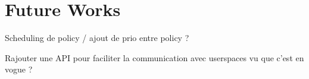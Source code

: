 \section{Future Works}
\par Scheduling de policy / ajout de prio entre policy ?
\par Rajouter une API pour faciliter la communication avec userspaces vu que c'est en vogue ?
